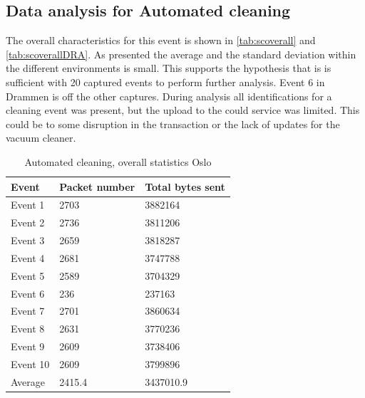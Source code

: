 


\subsection{Data analysis for Automated cleaning}
The overall characteristics for this event is shown in \ref{tab:scoverall} and \ref{tab:scoverallDRA}. As presented the average and the standard deviation within the different environments is small. This supports the hypothesis that is is sufficient with 20 captured events to perform further analysis. Event 6 in Drammen is off the other captures. During analysis all identifications for a cleaning event was present, but the upload to the could service was limited. This could be to some disruption in the transaction or the lack of updates for the vacuum cleaner. 

\begin{table}[H]
\centering
\caption{Automated cleaning, overall statistics Oslo}
\label{tab:ACoverallOSL}
\begin{tabular}{|l|l|l|}
\hline
\textbf{Event} & \textbf{Packet number} & \textbf{Total bytes sent} \\ \hline
Event 1        & 2703                   & 3882164                   \\ \hline
Event 2        & 2736                   & 3811206                   \\ \hline
Event 3        & 2659                   & 3818287                   \\ \hline
Event 4        & 2681                   & 3747788                   \\ \hline
Event 5        & 2589                   & 3704329                   \\ \hline
Event 6        & 236                    & 237163                    \\ \hline
Event 7        & 2701                   & 3860634                   \\ \hline
Event 8        & 2631                   & 3770236                   \\ \hline
Event 9        & 2609                   & 3738406                   \\ \hline
Event 10       & 2609                   & 3799896                   \\ \hline
Average        & 2415.4                 & 3437010.9                 \\ \hline
\end{tabular}
\end{table}

